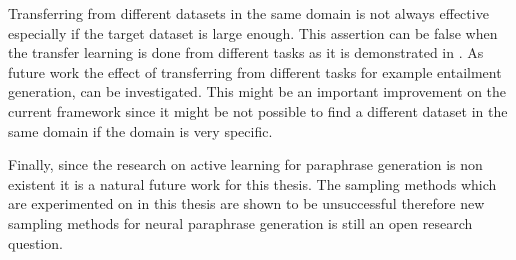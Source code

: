 Transferring from different datasets in the same domain is not always effective especially if the target dataset is large enough. This assertion can be false when the transfer learning is done from different tasks as it is demonstrated in \cite{brad}. As future work the effect of transferring from different tasks for example entailment generation, can be investigated. This might be an important improvement on the current framework since it might be not possible to find a different dataset in the same domain if the domain is very specific.

Finally, since the research on active learning for paraphrase generation is non existent it is a natural future work for this thesis. The sampling methods which are experimented on in this thesis are shown to be unsuccessful therefore new sampling methods for neural paraphrase generation is still an open research question.